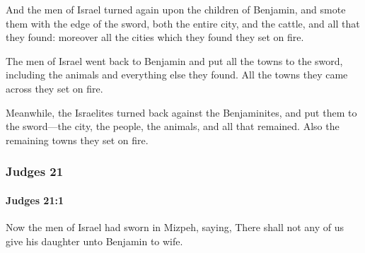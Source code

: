 			\begin{versebox}
					\item[BHS] 
					\item[ASV] And the men of Israel turned again upon the children of Benjamin, and smote them with the edge of the sword, both the entire city, and the cattle, and all that they found: moreover all the cities which they found they set on fire.
					\item[NIV] The men of Israel went back to Benjamin and put all the towns to the sword, including the animals and everything else they found. All the towns they came across they set on fire.
					\item[NRSV] Meanwhile, the Israelites turned back against the Benjaminites, and put them to the sword—the city, the people, the animals, and all that remained. Also the remaining towns they set on fire.
			\end{versebox}
	\subsubsection{Judges 21} %
		\label{JUDGES-21}

		\paragraph{Judges 21:1} %
			\label{JUDGES-21-1}

			Now the men of Israel had sworn in Mizpeh, saying, There shall not any of us give his daughter unto Benjamin to wife.

